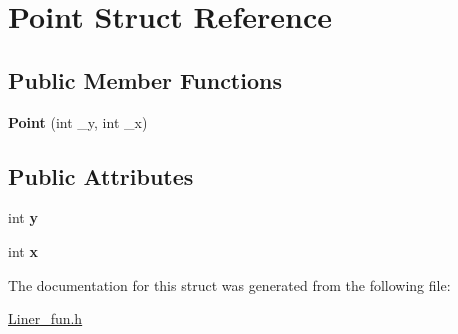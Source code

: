 \hypertarget{struct_point}{}\section{Point Struct Reference}
\label{struct_point}
\subsection*{Public Member Functions}
\begin{DoxyCompactItemize}
\item 
\mbox{\label{struct_point_ae5af86d9f01d1707873318989f7c4088}} 
{\bfseries Point} (int \+\_\+y, int \+\_\+x)
\end{DoxyCompactItemize}
\subsection*{Public Attributes}
\begin{DoxyCompactItemize}
\item 
\mbox{\label{struct_point_a2e1b5fb2b2a83571f5c0bc0f66a73cf7}} 
int {\bfseries y}
\item 
\mbox{\label{struct_point_a8c779e11e694b20e0946105a9f5de842}} 
int {\bfseries x}
\end{DoxyCompactItemize}


The documentation for this struct was generated from the following file\+:\begin{DoxyCompactItemize}
\item 
\hyperlink{_liner__fun_8h}{Liner\+\_\+fun.\+h}\end{DoxyCompactItemize}
